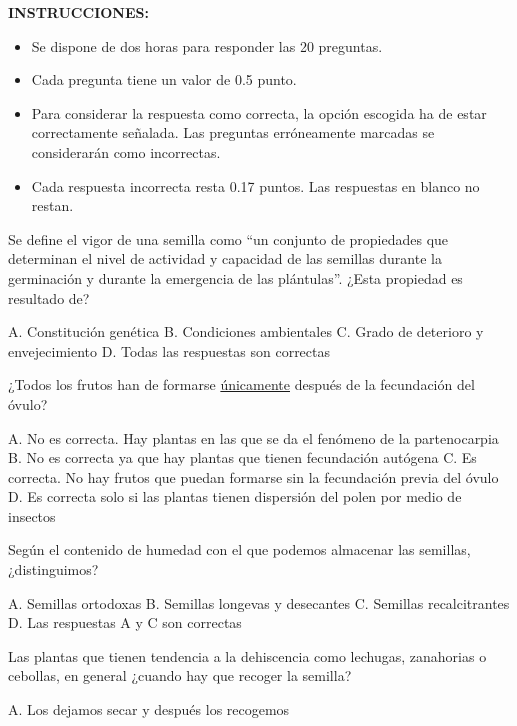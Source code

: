 \documentclass[11pt]{exam}
\begin{document}
{\selectfont
\textbf{INSTRUCCIONES:}
\begin{itemize}
    \item Se dispone de dos horas para responder las 20 preguntas.
    \item Cada pregunta tiene un valor de 0.5 punto.
    \item Para considerar la respuesta como correcta, la opción escogida ha de
      estar correctamente señalada. Las preguntas erróneamente marcadas se
      considerarán como incorrectas. 
    \item Cada respuesta incorrecta resta 0.17 puntos. Las respuestas en blanco no restan. 
\end{itemize}
\vspace{1cm}
  \begin{questions}
\question Se define el vigor de una semilla como ``un conjunto de propiedades
que determinan el nivel de actividad y capacidad de las semillas durante la
germinación y durante la emergencia de las plántulas''. ¿Esta propiedad es
resultado de? 
\begin{checkboxes}
  \choice A. Constitución genética
  \choice B. Condiciones ambientales
  \choice C. Grado de deterioro y envejecimiento
  \CorrectChoice D. Todas las respuestas son correctas
\end{checkboxes}
\question ¿Todos los frutos han de formarse \uline{únicamente} después de la
fecundación del óvulo?
\begin{checkboxes}
  \CorrectChoice A. No es correcta. Hay plantas en las que se da el fenómeno de
  la partenocarpia
  \choice B. No es correcta ya que hay plantas que tienen fecundación autógena
  \choice C. Es correcta. No hay frutos que puedan formarse sin la fecundación
  previa del óvulo
  \choice D. Es correcta solo si las plantas tienen dispersión del polen por
  medio de insectos
\end{checkboxes}
\question Según el contenido de humedad con el que podemos almacenar las
semillas, ¿distinguimos?
\begin{checkboxes}
  \choice A. Semillas ortodoxas
  \choice B. Semillas longevas y desecantes
  \choice C. Semillas recalcitrantes
  \CorrectChoice D. Las respuestas A y C son correctas
\end{checkboxes}
\question Las plantas que tienen tendencia a la dehiscencia como lechugas,
  zanahorias o cebollas, en general ¿cuando hay que recoger la semilla?
  \begin{checkboxes}
    \choice A. Los dejamos secar y después los recogemos

\end{checkboxes}
\end{questions}}
\end{document}

